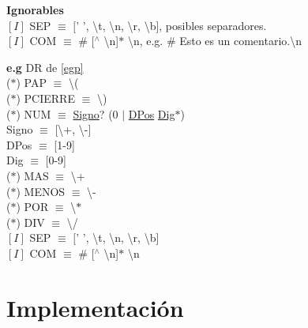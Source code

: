\documentclass[\main/Apuntes_PL.tex]{subfiles}
\begin{document}
      \newpage
      \par
      \textbf{\large Ignorables} \\
      \hspace{3mm}$[I]$ SEP $\equiv$ $[$' ', \textbackslash t, \textbackslash n, \textbackslash r, \textbackslash b], posibles separadores. \\
      \hspace{3mm}$[I]$ COM $\equiv$ \# [$^\wedge$ \textbackslash n]$\ast$ \textbackslash n, e.g. \# Esto es un comentario.\textbackslash n

      \bigskip
      \par
      \textbf{e.g}  DR de \cref{egp}\\
      \hspace{5mm}($\ast$) PAP $\equiv$ \textbackslash( \\
      \hspace{5mm}($\ast$) PCIERRE $\equiv$ \textbackslash) \\
      \hspace{5mm}($\ast$) NUM $\equiv$ \underline{Signo}? (0 $\mid$ \underline{DPos} \underline{Dig}$\ast$) \\
      \hspace{10mm} Signo $\equiv$ [\textbackslash+, \textbackslash-] \\
      \hspace{10mm} DPos  $\equiv$ [1-9] \\
      \hspace{10mm} Dig   $\equiv$ [0-9] \\
      \hspace{5mm}($\ast$) MAS $\equiv$ \textbackslash + \\
      \hspace{5mm}($\ast$) MENOS $\equiv$ \textbackslash - \\
      \hspace{5mm}($\ast$) POR $\equiv$ \textbackslash $\ast$ \\
      \hspace{5mm}($\ast$) DIV $\equiv$ \textbackslash / \\
      \hspace{5mm}$[I]$ SEP $\equiv$ $[$' ', \textbackslash t, \textbackslash n, \textbackslash r, \textbackslash b]\\
      \hspace{5mm}$[I]$ COM $\equiv$ \# [$^\wedge$ \textbackslash n]$\ast$ \textbackslash n

  \section{Implementación}
\end{document}

